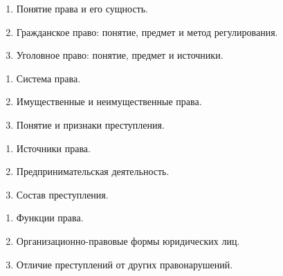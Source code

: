 


\shapkFull
\setcounter{zad}{0}

\begin{enumerate}
	\item Понятие права и его сущность.

	\item Гражданское право: понятие, предмет и метод регулирования.

	\item Уголовное право: понятие, предмет и источники.

\end{enumerate}

\newpage


\shapkFull
\setcounter{zad}{0}

\begin{enumerate}
	\item Система права.

	\item Имущественные и неимущественные права.

	\item Понятие и признаки преступления.

\end{enumerate}

\newpage


\shapkFull
\setcounter{zad}{0}

\begin{enumerate}
	\item Источники права.

	\item Предпринимательская деятельность.

	\item Состав преступления.

\end{enumerate}

\newpage


\shapkFull
\setcounter{zad}{0}

\begin{enumerate}
	\item Функции права.

	\item Организационно-правовые формы юридических лиц.

	\item Отличие преступлений от других правонарушений.

\end{enumerate}

